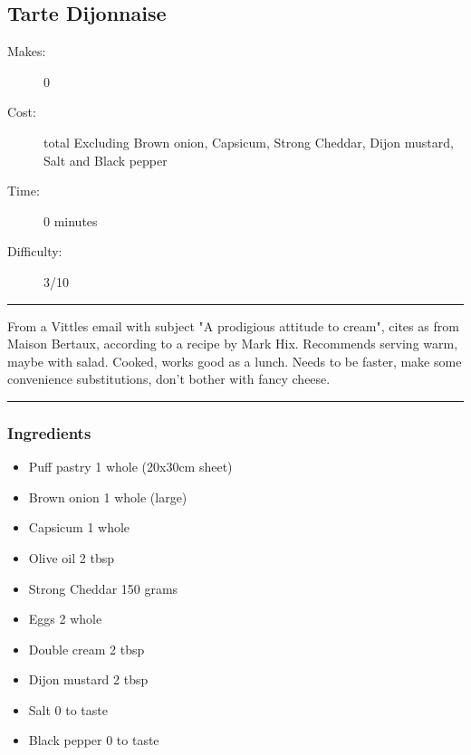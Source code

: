\documentclass[]{article}
\begin{document}
\subsection*{\center\huge Tarte Dijonnaise}
\begin{description}
\item[Makes:] 0 
\item[Cost:]  total Excluding Brown onion, Capsicum, Strong Cheddar, Dijon mustard, Salt and Black pepper
\item[Time:] 0 minutes
\item[Difficulty:] 3/10
\end{description}
\vspace{0.2cm}\hrule\vspace{0.5cm}
\begin{adjustwidth}{0.5 cm}{0.5 cm}

From a Vittles email with subject "A prodigious attitude to cream", cites as from Maison Bertaux, according to a recipe by Mark Hix. Recommends serving warm, maybe with salad. Cooked, works good as a lunch. Needs to be faster, make some convenience substitutions, don't bother with fancy cheese. \hfill{}\color{black}

\end{adjustwidth}
\vspace{0.5cm}\hrule
\subsubsection*{\Large Ingredients}
\begin{multicols}{2}
\begin{itemize}
 \item Puff pastry \hfill 1 whole (20x30cm sheet)
 \item Brown onion \hfill 1 whole (large)
 \item Capsicum \hfill 1 whole
 \item Olive oil \hfill 2 tbsp
 \item Strong Cheddar \hfill 150 grams
 \item Eggs \hfill 2 whole
 \item Double cream \hfill 2 tbsp
 \item Dijon mustard \hfill 2 tbsp
 \item Salt \hfill 0 to taste
 \item Black pepper \hfill 0 to taste
\end{itemize}
\end{multicols}
\end{document}
